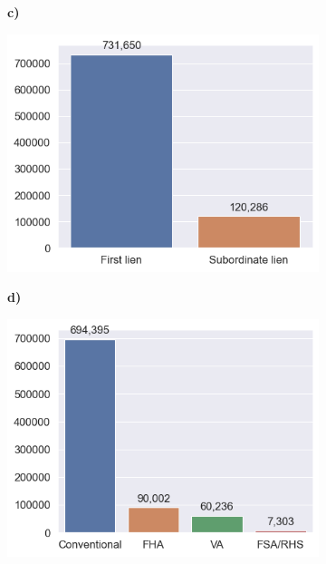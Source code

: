 \begin{figure}[!htbp]
\begin{minipage}[b]{0.5\textwidth}
\begin{subfigure}[t]{0.9\textwidth}
        \end{subfigure}
    \end{minipage}%
    \hfill\allowbreak%
    \begin{minipage}[b]{0.5\textwidth}
        \centering
        \begin{subfigure}[t]{0.06\textwidth}
            \textbf{c)}
        \end{subfigure}
        \begin{subfigure}[t]{0.9\textwidth}
            \includegraphics[width=\linewidth, valign=t]{images/HMDA_features/HMDA_features_lien.png}
        \end{subfigure}
    \end{minipage}%
    \begin{minipage}[b]{0.5\textwidth}
        \centering
        \begin{subfigure}[t]{0.06\textwidth}
            \textbf{d)}
        \end{subfigure}
        \begin{subfigure}[t]{0.9\textwidth}
            \includegraphics[width=\linewidth, valign=t]{images/HMDA_features/HMDA_features_type.png}

\end{subfigure}
\end{minipage}
\end{figure}
